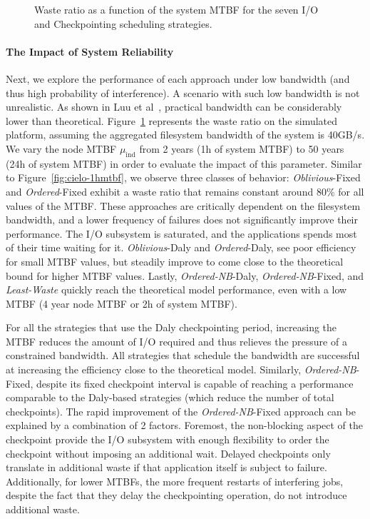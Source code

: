 \documentclass[conference,nofonttune]{IEEEtran}
\newcommand{\muind}{\mu_{\text{ind}}}
\newcommand{\nocoop}{\emph{Oblivious}\xspace}
\newcommand{\fifoblock}{\emph{Ordered}\xspace}
\newcommand{\fifononblock}{\emph{Ordered-NB}\xspace}
\newcommand{\leastwaste}{\emph{Least-Waste}\xspace}
\def\propfixed{\nocoop-Fixed\xspace}
\def\propdaly{\nocoop-Daly\xspace}
\def\bfifofixed{\fifoblock-Fixed\xspace}
\def\bfifodaly{\fifoblock-Daly\xspace}
\def\fifofixed{\fifononblock-Fixed\xspace}
\def\fifodaly{\fifononblock-Daly\xspace}
\def\cooperative{\leastwaste}
\begin{document}
\begin{figure}
  \begin{center}
    \resizebox{1.05\linewidth}{!}{}
  \end{center}
  \caption{Waste ratio as a function of the system MTBF for the
    seven I/O and Checkpointing scheduling strategies. \label{fig:cielo-40gbs}}
\end{figure}

\paragraph{The Impact of System Reliability}
Next, we explore the performance of each approach under low bandwidth (and
thus high probability of interference). A scenario with such low bandwidth is not
unrealistic.  As shown in Luu et al~\cite{Luu:2015:Multiplatform}, practical
bandwidth can be considerably lower than theoretical.
Figure~\ref{fig:cielo-40gbs} represents the waste ratio on the
simulated platform, assuming the
aggregated filesystem bandwidth of the system is 40GB/s. We vary the node MTBF
$\muind$ from 2 years (1h of system MTBF) to 50 years (24h of system MTBF) in
order to evaluate the impact of this parameter. Similar to
Figure~\ref{fig:cielo-1hmtbf}, we observe three classes of behavior: \propfixed
and \bfifofixed exhibit a waste ratio that remains constant around 80\% for all
values of the MTBF. These approaches are critically dependent on the filesystem
bandwidth, and a lower frequency of failures does not significantly improve
their performance. The I/O subsystem is saturated, and the applications spends
most of their time waiting for it.
%
\propdaly and \bfifodaly, see poor efficiency for small MTBF values, but
steadily improve to come close to the theoretical bound for higher MTBF values.
Lastly, \fifodaly, \fifofixed, and \cooperative quickly reach the theoretical
model performance, even with a low  MTBF (4 year node MTBF or 2h of
system MTBF).

For all the strategies that use the Daly checkpointing period, increasing the
MTBF reduces the amount of I/O required and thus relieves the pressure of a
constrained bandwidth. All strategies that schedule the bandwidth are
successful at increasing the efficiency close to the theoretical model.
%
Similarly, \fifofixed, despite its fixed checkpoint interval is capable of
reaching a performance comparable to the Daly-based strategies (which reduce the
number of total checkpoints). The rapid improvement of the \fifofixed approach can be
explained by a combination of 2 factors. Foremost, the non-blocking aspect of
the checkpoint provide the I/O subsystem with enough flexibility to order the
checkpoint without imposing an additional wait. Delayed checkpoints only translate
in additional waste if that application itself is subject to failure.
Additionally, for lower MTBFs, the more frequent restarts of interfering jobs,
despite the fact that they delay the checkpointing operation, do not introduce
additional waste.
\end{document}
